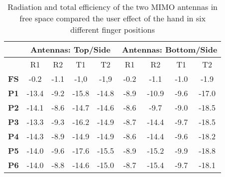 \begin{table}[]
\centering
\begin{tabular}{|c|c|c|c|c|c|c|c|c|}
\hline
            & \multicolumn{4}{c|}{\textbf{Antennas: Top/Side}} & \multicolumn{4}{c|}{\textbf{Antennas: Bottom/Side}} \\ \hline
            & R1         & R2        & T1         & T2         & R1         & R2          & T1         & T2          \\ \hline
\textbf{FS} & -0.2       & -1.1      & -1,0       & -1,9       & -0.2       & -1.1        & -1.0       & -1.9        \\ \hline
\textbf{P1} & -13.4      & -9.2      & -15.8      & -14.8      & -8.9       & -10.9       & -9.6       & -17.0       \\ \hline
\textbf{P2} & -14.1      & -8.6      & -14.7      & -14.6      & -8.6       & -9.7        & -9.0       & -18.5       \\ \hline
\textbf{P3} & -13.3      & -9.3      & -16.2      & -14.9      & -8.7       & -14.4       & -9.7       & -18.5       \\ \hline
\textbf{P4} & -14.3      & -8.9      & -14.9      & -14.9      & -8.6       & -14.4       & -9.6       & -18.2       \\ \hline
\textbf{P5} & -14.0      & -9.6      & -17.6      & -15.5      & -8.9       & -15.2       & -9.9       & -18.8       \\ \hline
\textbf{P6} & -14.0      & -8.8      & -14.6      & -15.0      & -8.7       & -15.4       & -9.7       & -18.1       \\ \hline
\end{tabular}
\caption{Radiation and total efficiency of the two MIMO antennas in free space compared the user effect of the hand in six different finger positions \cite{Samantha2014UserEff}}
\label{tab:usereff_radeff}
\end{table}